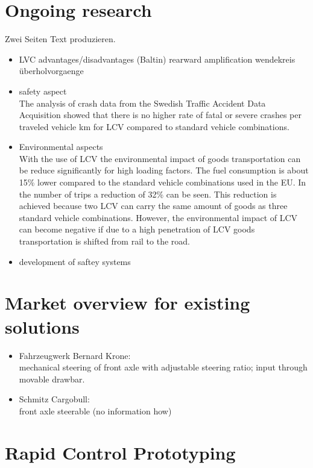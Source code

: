 \documentclass[ExampleMasters.tex]{subfiles}
\begin{document}
\section{Ongoing research}
\label{sec:ongoing_research}
Zwei Seiten Text produzieren. 
\begin{itemize}
	\item LVC advantages/disadvantages (Baltin)
	\subitem rearward amplification
	\subitem wendekreis
	\subitem überholvorgaenge
	\item safety aspect \\
	The analysis of crash data from the Swedish Traffic Accident Data Acquisition showed that there is no higher rate of fatal or severe crashes per traveled vehicle km for LCV compared to standard vehicle combinations. \cite{balint2013correlation}

	\item Environmental aspects \\
	With the use of LCV the environmental impact of goods transportation can be reduce significantly for high loading factors. The fuel consumption is about 15\% lower compared to the standard vehicle combinations used in the EU. In the number of trips a reduction of 32\% can be seen. This reduction is achieved because two LCV can carry the same amount of goods as three standard vehicle combinations.  \cite{backman2002improved}
	However, the environmental impact of LCV can become negative if due to a high penetration of LCV goods transportation is shifted from rail to the road. \cite{doll2009long}
	\item development of saftey systems
\end{itemize}

\section{Market overview for existing solutions}
\label{sec:market_overview}
\begin{itemize}
	\item Fahrzeugwerk Bernard Krone: \\
	mechanical steering of front axle with adjustable steering ratio; input through movable drawbar.
	\item Schmitz Cargobull: \\
	front axle steerable (no information how)
	
\end{itemize}
\section{Rapid Control Prototyping}
\label{sec:rapid_proto}
\end{document}
